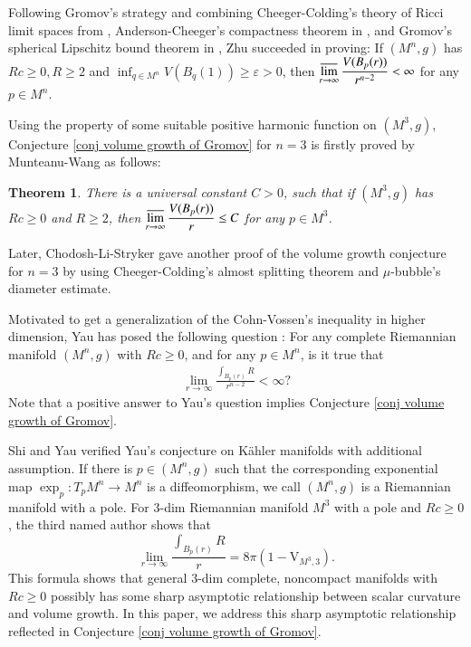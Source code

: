 \documentclass[11pt]{amsart}
\newtheorem{theorem}{Theorem}[section]
\numberwithin{equation}{section}
\begin{document}
Following Gromov's strategy and combining Cheeger-Colding's theory of Ricci limit spaces from \cite{CC-I}, Anderson-Cheeger's compactness theorem in \cite{AC}, and Gromov's spherical Lipschitz bound theorem in \cite{Gromov-MI}, Zhu \cite{Zhu} succeeded in proving: If $(M^n,  g)$ has $Rc\geq 0, R\geq 2$ and $\displaystyle \inf_{q\in M^n}V(B_q(1))\geq \varepsilon> 0$, then $\displaystyle \varlimsup_{r\rightarrow\infty} \frac{V(B_p(r))}{r^{n- 2}}< \infty$ for any $p\in M^n$.

Using the property of some suitable positive harmonic function on $(M^3, g)$,  Conjecture \ref{conj volume growth of Gromov} for $n= 3$ is firstly proved by Munteanu-Wang \cite{MW-II} as follows: 
\begin{theorem}\nonumber 
{There is a universal constant $C> 0$,  such that if $(M^3,  g)$ has $Rc\geq 0$ and $R\geq 2$, then $\displaystyle \varlimsup_{r\rightarrow\infty} \frac{V(B_p(r))}{r}\leq C$ for any $p\in M^3$.
}
\end{theorem}

Later, Chodosh-Li-Stryker \cite{CLS} gave another proof of the volume growth conjecture for $n= 3$ by using Cheeger-Colding's almost splitting theorem \cite{CC-Ann} and $\mu$-bubble's diameter estimate.

Motivated to get a generalization of the Cohn-Vossen's inequality in higher dimension,  Yau has posed the following question \cite[Problem 9]{Yau}: For any complete Riemannian manifold $(M^n, g)$ with $Rc\geq 0$, and for any $p\in M^n$, is it true that 
\begin{align}
\lim\limits_{r\rightarrow \infty} \frac{\int_{B_p(r)}R}{r^{n- 2}} < \infty ? \nonumber 
\end{align}
Note that a positive answer to Yau's question implies Conjecture \ref{conj volume growth of Gromov}. 

Shi and Yau \cite{SY} verified Yau's conjecture on K\"ahler manifolds with additional assumption.  If there is $p\in (M^n, g)$ such that the corresponding exponential map $\exp_p: T_pM^n\rightarrow M^n$ is a diffeomorphism, we call $(M^n,  g)$ is a Riemannian manifold with a pole.  For $3$-dim Riemannian manifold $M^3$ with a pole and $Rc\geq 0$,  the third named author \cite{Xu-IOCII} shows that
$$\displaystyle \lim_{r\rightarrow\infty} \frac{\int_{B_p(r)}R}{r}= 8\pi (1- \mathrm{V}_{M^3, 3}).$$
This formula shows that general  $3$-dim complete,  noncompact manifolds with $Rc\geq 0$ possibly has some sharp asymptotic relationship between scalar curvature and volume growth.  In this paper,  we address this sharp asymptotic relationship reflected in Conjecture \ref{conj volume growth of Gromov}. 
\end{document}
